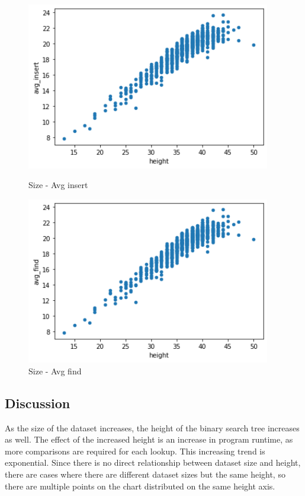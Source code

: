 \documentclass[a4]{article}
\begin{document}
\begin{figure}[H]
    \begin{minipage}{0.48\textwidth}
    \includegraphics[width=0.95\textwidth]{b-height-insert.png}
    \caption{Size - Avg insert}
    \end{minipage}
    \begin{minipage}{0.48\textwidth}
    \includegraphics[width=0.95\textwidth]{b-height-find.png}
    \caption{Size - Avg find}
    \end{minipage}
\end{figure}

\subsection{Discussion}

As the size of the dataset increases, the height of the binary search tree increases as well. The effect of the increased height is an increase in program runtime, as more comparisons are required for each lookup. This increasing trend is exponential. Since there is no direct relationship between dataset size and height, there are cases where there are different dataset sizes but the same height, so there are multiple points on the chart distributed on the same height axis.\\
\end{document}
